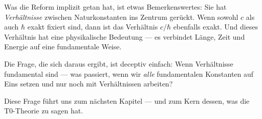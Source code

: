 Was die Reform implizit getan hat, ist etwas Bemerkenswertes: Sie hat \emph{Verhältnisse} zwischen Naturkonstanten ins Zentrum gerückt. Wenn sowohl $c$ als auch $\hbar$ exakt fixiert sind, dann ist das Verhältnis $c/\hbar$ ebenfalls exakt. Und dieses Verhältnis hat eine physikalische Bedeutung --- es verbindet Länge, Zeit und Energie auf eine fundamentale Weise.

Die Frage, die sich daraus ergibt, ist deceptiv einfach: Wenn Verhältnisse fundamental sind --- was passiert, wenn wir \emph{alle} fundamentalen Konstanten auf Eins setzen und nur noch mit Verhältnissen arbeiten?

Diese Frage führt uns zum nächsten Kapitel --- und zum Kern dessen, was die T0-Theorie zu sagen hat.
